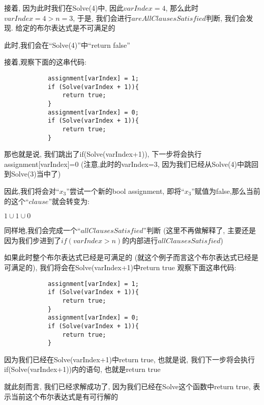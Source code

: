         接着,
        因为此时我们在Solve(4)中,
        因此$varIndex=4$,
        那么此时$varIndex=4>n=3$,
        于是,
        我们会进行$areAllClausesSatisfied$判断,
        我们会发现.
        给定的布尔表达式是不可满足的\par
        此时,我们会在``Solve(4)''中``return false''
        \par
        接着,观察下面的这串代码:
        \begin{lstlisting}
            assignment[varIndex] = 1;
            if (Solve(varIndex + 1)){
                return true;
            }
            assignment[varIndex] = 0;
            if (Solve(varIndex + 1)){
                return true;
            } 
        \end{lstlisting}
        \par
        那也就是说,
        我们跳出了if(Solve(varIndex+1)),
        下一步将会执行assignment[varIndex]=0
        (注意,此时的varIndex=3,
        因为我们已经从Solve(4)中跳回到Solve(3)当中了)
        \par
        因此,我们将会对``$x_{3}$''尝试一个新的bool assignment,
        即将``$x_{3}$''赋值为false,那么当前的这个``$clause$''就会转变为:
        \begin{center}
            $1 \cup 1 \cup 0$
        \end{center}
        \par
        同样地,我们会完成一个``$allClausesSatisfied$''判断
        (这里不再做解释了,
        主要还是因为我们步进到了$if(varIndex>n)$的内部进行$allClausesSatisfied$)\par
        如果此时整个布尔表达式已经是可满足的
        (就这个例子而言这个布尔表达式已经是可满足的),
        我们将会在Solve(varIndex+1)中return true
        观察下面这串代码:
        \begin{lstlisting}
            assignment[varIndex] = 1;
            if (Solve(varIndex + 1)){
                return true;
            }
            assignment[varIndex] = 0;
            if (Solve(varIndex + 1)){
                return true;
            } 
        \end{lstlisting}
        \par
        因为我们已经在Solve(varIndex+1)中return true,
        也就是说,
        我们下一步将会执行if(Solve(varIndex+1))内的语句,
        也就是return true
        \par
        就此刻而言,
        我们已经求解成功了,
        因为我们已经在Solve这个函数中return true,
        表示当前这个布尔表达式是有可行解的
        \par

